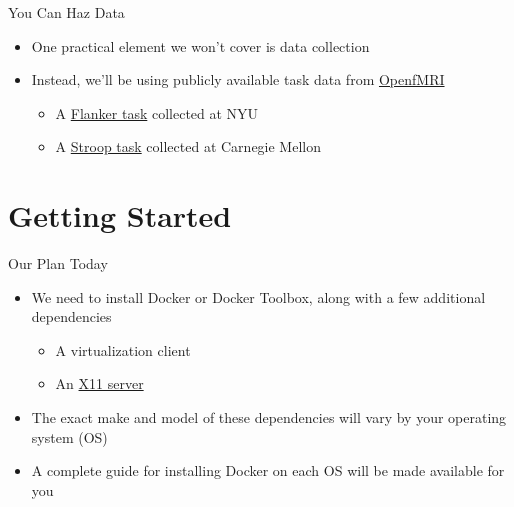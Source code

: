 \documentclass[t,12pt]{beamer}
\begin{document}
\begin{frame}{You Can Haz Data}
\vspace{10pt}
\begin{itemize}
\setlength\itemsep{1em}
  \item One practical element we won't cover is data collection
  \item Instead, we'll be using publicly available task data from \href{https://openfmri.org/}{OpenfMRI}
  \vspace{4pt}
  \begin{itemize}
  \setlength\itemsep{0.5em}
    \item A \href{https://openfmri.org/dataset/ds000102/}{Flanker task} collected at NYU
    \item A \href{https://openfmri.org/dataset/ds000164/}{Stroop task} collected at Carnegie Mellon
  \end{itemize}
\end{itemize}
\end{frame}

\section{Getting Started}

\begin{frame}{Our Plan Today}
\vspace{10pt}
\begin{itemize}
\setlength\itemsep{1em}
  \item We need to install Docker or Docker Toolbox, along with a few additional dependencies
  \vspace{4pt}
  \begin{itemize}
  \setlength\itemsep{0.5em}
    \item A virtualization client
    \item An \href{https://en.wikipedia.org/wiki/X_Window_System}{X11 server}
  \end{itemize}
  \item The exact make and model of these dependencies will vary by your operating system (OS)
    \item A complete guide for installing Docker on each OS will be made available for you
\end{itemize}
\end{frame}
\end{document}
